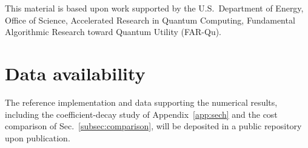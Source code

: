 \documentclass[
    reprint,
    amsmath,amssymb,
    aps,
    pra,
    superscriptaddress,
    floatfix
]{revtex4-2}
\theoremstyle{aps}
\begin{document}
\maketitle







\begin{acknowledgments}
	This material is based upon work supported by the U.S.\
	Department of Energy, Office of Science, Accelerated Research
	in Quantum Computing, Fundamental Algorithmic Research toward
	Quantum Utility (FAR-Qu).
\end{acknowledgments}

\section*{Data availability}
The reference implementation and data supporting the numerical
results, including the coefficient-decay study of
Appendix~\ref{app:sech} and the cost comparison of
Sec.~\ref{subsec:comparison}, will be deposited in a public repository
upon publication.




\end{document}
